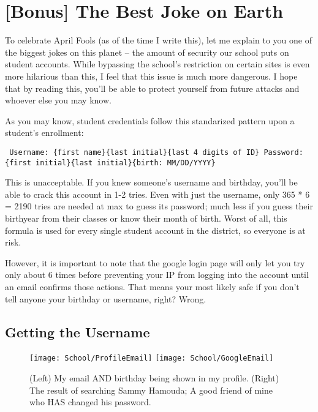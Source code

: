 \section{[Bonus] The Best Joke on Earth}

To celebrate April Fools (as of the time I write this), let me explain to you one of the biggest jokes on this planet -- the amount of security our school puts on student accounts. While bypassing the school's restriction on certain sites is even more hilarious than this, I feel that this issue is much more dangerous. I hope that by reading this, you'll be able to protect yourself from future attacks and whoever else you may know.

As you may know, student credentials follow this standarized pattern upon a student's enrollment:

\begin{centering}
\texttt{
Username: \{first name\}\{last initial\}\{last 4 digits of ID\} \newline
Password: \{first initial\}\{last initial\}\{birth: MM/DD/YYYY\}
}
\end{centering}

This is unacceptable. If you knew someone's username and birthday, you'll be able to crack this account in 1-2 tries. Even with just the username, only 365 * 6 = 2190 tries are needed at max to guess its password; much less if you guess their birthyear from their classes or know their month of birth. Worst of all, this formula is used for every single student account in the district, so everyone is at risk.

However, it is important to note that the google login page will only let you try only about 6 times before preventing your IP from logging into the account until an email confirms those actions. That means your most likely safe if you don't tell anyone your birthday or username, right? Wrong.

\subsection*{Getting the Username}


\begin{figure}[h]
    \centering
    \texttt{[image: School/ProfileEmail]}
    \texttt{[image: School/GoogleEmail]}
    \caption{
        (Left) My email AND birthday being shown in my profile. (Right) The result of searching Sammy Hamouda; A good friend of mine who HAS changed his password.
    }
\end{figure}

